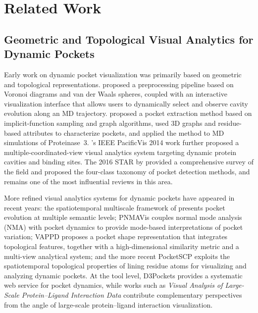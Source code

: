 \documentclass[11pt,a4paper]{article}
\begin{document}
\section{Related Work}

\subsection{Geometric and Topological Visual Analytics for
            Dynamic Pockets}
Early work on dynamic pocket visualization was primarily based on
geometric and topological representations.
\citet{lindow2013exploring} proposed a preprocessing pipeline based
on Voronoi diagrams and van der Waals spheres, coupled with an
interactive visualization interface that allows users to dynamically
select and observe cavity evolution along an MD trajectory.
\citet{parulek2013visual} proposed a pocket extraction method based
on implicit-function sampling and graph algorithms, used 3D graphs
and residue-based attributes to characterize pockets, and applied
the method to MD simulations of Proteinase~3.
\citet{krone2014visual}'s IEEE PacificVis 2014 work further proposed
a multiple-coordinated-view visual analytics system targeting dynamic
protein cavities and binding sites. The 2016 STAR by
\citet{krone2016visual} provided a comprehensive survey of the field
and proposed the four-class taxonomy of pocket detection methods, and
remains one of the most influential reviews in this area.

More refined visual analytics systems for dynamic pockets have
appeared in recent years: the spatiotemporal multiscale framework of
\citet{zhan2020spatiotemporal} presents pocket evolution at multiple
semantic levels; PNMAVis \citep{guo2022pnmavis} couples normal mode
analysis (NMA) with pocket dynamics to provide mode-based
interpretations of pocket variation; VAPPD \citep{guo2022vappd} proposes
a pocket shape representation that integrates topological features,
together with a high-dimensional similarity metric and a multi-view
analytical system; and the more recent PocketSCP \citep{guo2025pocketscp}
exploits the spatiotemporal topological properties of lining residue
atoms for visualizing and analyzing dynamic pockets. At the tool
level, D3Pockets \citep{xu2019d3pockets} provides a systematic web service
for pocket dynamics, while works such as
\textit{Visual Analysis of Large-Scale Protein--Ligand Interaction
Data} \citep{schatz2021visual} contribute complementary
perspectives from the angle of large-scale protein--ligand
interaction visualization.
\end{document}
